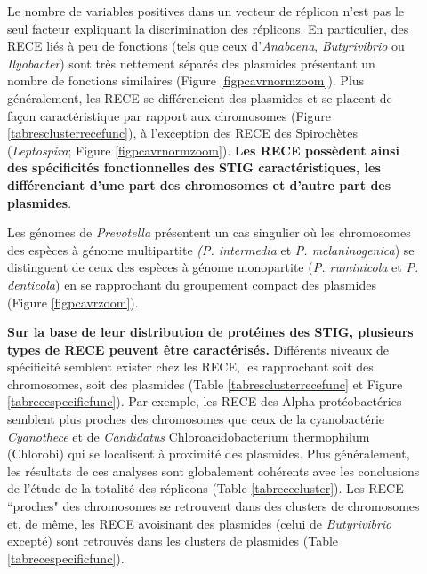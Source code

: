 \begin{description}
\item[\textbullet] Le nombre de variables positives dans un vecteur de réplicon n'est pas le seul facteur expliquant la discrimination des réplicons. En particulier, des RECE liés à peu de fonctions (tels que ceux d'\textit{Anabaena}, \textit{Butyrivibrio} ou \textit{Ilyobacter}) sont très nettement séparés des plasmides présentant un nombre de fonctions similaires (Figure \ref{figpcavrnormzoom}). Plus généralement, les RECE se différencient des plasmides et se placent de façon caractéristique par rapport aux chromosomes (Figure \ref{tabresclusterrecefunc}), à l'exception des RECE des Spirochètes (\textit{Leptospira}; Figure \ref{figpcavrnormzoom}). \textbf{\color{orange} Les RECE possèdent ainsi des spécificités fonctionnelles des STIG caractéristiques, les différenciant d'une part des chromosomes et d'autre part des plasmides}. 

\item[\textbullet]Les génomes de \textit{Prevotella} présentent un cas singulier où les chromosomes des espèces à génome multipartite \textit{(P. intermedia} et \textit{P. melaninogenica}) se distinguent de ceux des espèces à génome monopartite (\textit{P. ruminicola} et \textit{P. denticola}) en se rapprochant du groupement compact des plasmides (Figure \ref{figpcavrzoom}).

\item[\textbullet] \textbf{Sur la base de leur distribution de protéines des STIG, plusieurs types de RECE peuvent être caractérisés.} Différents niveaux de spécificité semblent exister chez les RECE, les rapprochant soit des chromosomes, soit des plasmides (Table \ref{tabresclusterrecefunc} et Figure \ref{tabrecespecificfunc}). Par exemple, les RECE des Alpha-protéobactéries semblent plus proches des chromosomes que ceux de la cyanobactérie \textit{Cyanothece} et de \textit{Candidatus} Chloroacidobacterium thermophilum (Chlorobi) qui se localisent à proximité des plasmides. Plus généralement, les résultats de ces analyses sont globalement cohérents avec les conclusions de l'étude de la totalité des réplicons (Table \ref{tabrececluster}). Les RECE ``proches" des chromosomes se retrouvent dans des clusters de chromosomes et, de même, les RECE avoisinant des plasmides (celui de \textit{Butyrivibrio} excepté) sont retrouvés dans les clusters de plasmides (Table \ref{tabrecespecificfunc}).


\end{description}
